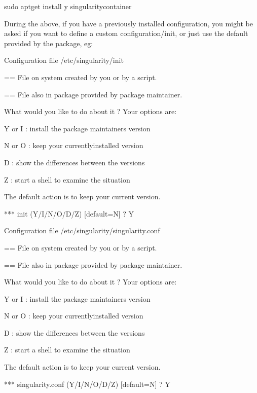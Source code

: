 \documentclass[letterpaper,10pt,english]{sphinxmanual}
\begin{document}
%
\begin{sphinxVerbatim}[commandchars=\\\{\}]
sudo apt\PYGZhy{}get install \PYGZhy{}y singularity\PYGZhy{}container
\end{sphinxVerbatim}

During the above, if you have a previously installed configuration, you might be asked if you want to define a custom configuration/init, or just use the default provided by the package, eg:

%
\begin{sphinxVerbatim}[commandchars=\\\{\}]
Configuration file \PYGZsq{}/etc/singularity/init\PYGZsq{}

  ==\PYGZgt{} File on system created by you or by a script.

  ==\PYGZgt{} File also in package provided by package maintainer.

    What would you like to do about it ?  Your options are:

      Y or I  : install the package maintainer\PYGZsq{}s version

      N or O  : keep your currently\PYGZhy{}installed version

        D     : show the differences between the versions

        Z     : start a shell to examine the situation

The default action is to keep your current version.

*** init (Y/I/N/O/D/Z) [default=N] ? Y


Configuration file \PYGZsq{}/etc/singularity/singularity.conf\PYGZsq{}

  ==\PYGZgt{} File on system created by you or by a script.

  ==\PYGZgt{} File also in package provided by package maintainer.

    What would you like to do about it ?  Your options are:

      Y or I  : install the package maintainer\PYGZsq{}s version

      N or O  : keep your currently\PYGZhy{}installed version

        D     : show the differences between the versions

        Z     : start a shell to examine the situation

The default action is to keep your current version.

*** singularity.conf (Y/I/N/O/D/Z) [default=N] ? Y
\end{sphinxVerbatim}
\end{document}
